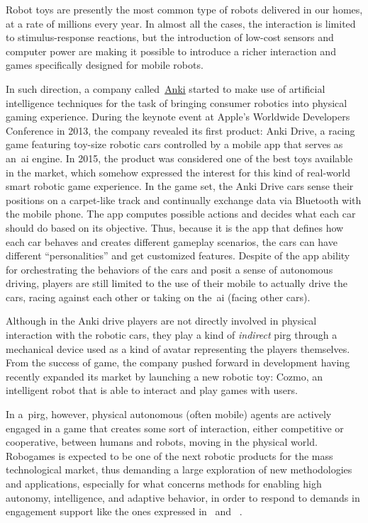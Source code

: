 Robot toys are presently the most common type of robots delivered in our homes, at a rate of millions every year. In almost all the cases, the interaction is limited to stimulus-response reactions, but the introduction of low-cost sensors and computer power are making it possible to introduce a richer interaction and games specifically designed for mobile robots.

In such direction, a company called~\href{https://anki.com/en-us}{Anki} started to make use of artificial intelligence techniques for the task of bringing consumer robotics into physical gaming experience. During the keynote event at Apple's Worldwide Developers Conference in 2013, the company revealed its first product: Anki Drive, a racing game featuring toy-size robotic cars controlled by a mobile app that serves as an~\gls{ai} engine. In 2015, the product was considered one of the best toys available in the market, which somehow expressed the interest for this kind of real-world smart robotic game experience. In the game set, the Anki Drive cars sense their positions on a carpet-like track and continually exchange data via Bluetooth with the mobile phone. The app computes possible actions and decides what each car should do based on its objective. Thus, because it is the app that defines how each car behaves and creates different gameplay scenarios, the cars can have different ``personalities'' and get customized features. Despite of the app ability for orchestrating the behaviors of the cars and posit a sense of autonomous driving, players are still limited to the use of their mobile to actually drive the cars, racing against each other or taking on the~\gls{ai} (facing other cars). 

Although in the Anki drive players are not directly involved in physical interaction with the robotic cars, they play a kind of \textit{indirect} \gls{pirg} through a mechanical device used as a kind of avatar representing the players themselves. From the success of game, the company pushed forward in development having recently expanded its market by launching a new robotic toy: Cozmo, an intelligent robot that is able to interact and play games with users.

In a~\gls{pirg}, however, physical autonomous (often mobile) agents are actively engaged in a game that creates some sort of interaction, either competitive or cooperative, between humans and robots, moving in the physical world. Robogames is expected to be one of the next robotic products for the mass technological market, thus demanding a large exploration of new methodologies and applications, especially for what concerns methods for enabling high autonomy, intelligence, and adaptive behavior, in order to respond to demands in engagement support like the ones expressed in~\cite{yannakakis_how_2008} and ~\cite{yannakakis_entertainment_2008,yannakakis_real-time_2009}. 

